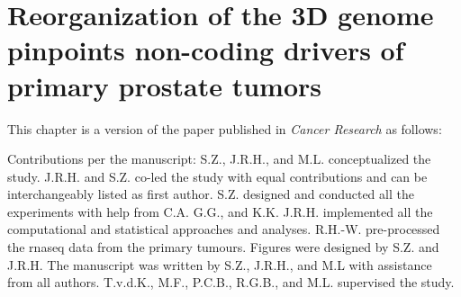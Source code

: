\chapter{Reorganization of the 3D genome pinpoints non-coding drivers of primary prostate tumors}
\label{chap:3D}

This chapter is a version of the paper published in \emph{Cancer Research} as follows:


\vspace{1em}

Contributions per the manuscript:
S.Z., J.R.H., and M.L. conceptualized the study.
J.R.H. and S.Z. co-led the study with equal contributions and can be interchangeably listed as first author.
S.Z. designed and conducted all the experiments with help from C.A. G.G., and K.K.
J.R.H. implemented all the computational and statistical approaches and analyses.
R.H.-W. pre-processed the \gls{rnaseq} data from the primary tumours.
Figures were designed by S.Z. and J.R.H.
The manuscript was written by S.Z., J.R.H., and M.L with assistance from all authors.
T.v.d.K., M.F., P.C.B., R.G.B., and M.L. supervised the study.








